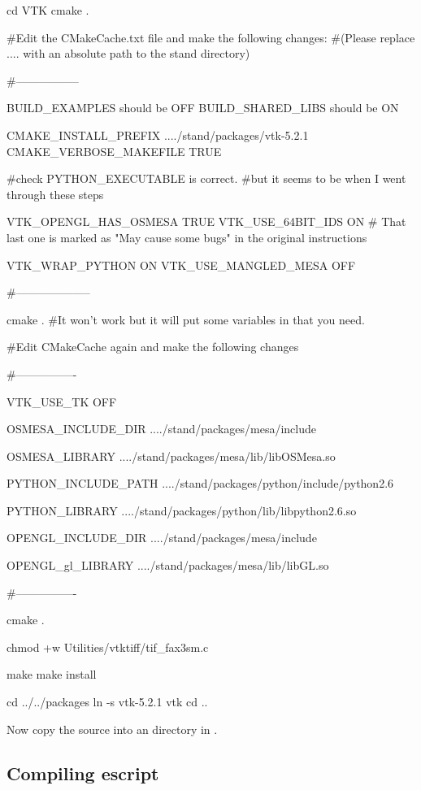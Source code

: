 \begin{shellCode}
cd VTK
cmake .

#Edit the CMakeCache.txt file and make the following changes: 
#(Please replace .... with an absolute path to the stand directory)

#-----------------

BUILD_EXAMPLES should be OFF
BUILD_SHARED_LIBS should be ON

CMAKE_INSTALL_PREFIX	..../stand/packages/vtk-5.2.1
CMAKE_VERBOSE_MAKEFILE	TRUE

#check PYTHON_EXECUTABLE is correct.
#but it seems to be when I went through these steps

VTK_OPENGL_HAS_OSMESA	TRUE
VTK_USE_64BIT_IDS	ON
# That last one is marked as "May cause some bugs" in the original instructions

VTK_WRAP_PYTHON	ON
VTK_USE_MANGLED_MESA	OFF

#--------------------

cmake .
#It won't work but it will put some variables in that you need.

#Edit CMakeCache again and make the following changes

#----------------

VTK_USE_TK	OFF

OSMESA_INCLUDE_DIR	..../stand/packages/mesa/include

OSMESA_LIBRARY	..../stand/packages/mesa/lib/libOSMesa.so

PYTHON_INCLUDE_PATH	..../stand/packages/python/include/python2.6

PYTHON_LIBRARY	..../stand/packages/python/lib/libpython2.6.so

OPENGL_INCLUDE_DIR	..../stand/packages/mesa/include

OPENGL_gl_LIBRARY	..../stand/packages/mesa/lib/libGL.so

#----------------

cmake .

chmod +w Utilities/vtktiff/tif_fax3sm.c

make
make install


cd ../../packages
ln -s vtk-5.2.1 vtk
cd ..
\end{shellCode}

Now copy the \esfinley source into an  directory in .

\subsection{Compiling escript}\label{sec:compileescriptlinux}

